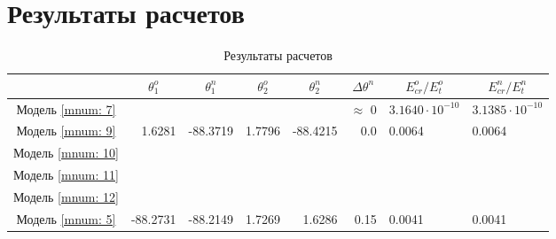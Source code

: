 \section{Результаты расчетов}

\begin{table}
\footnotesize
\centering
\caption{Результаты расчетов}
\renewcommand{\arraystretch}{1.5}
\begin{tabularx}{\textwidth}{C|rr|rr|r|ll}
				& &  &  &  & &  &  \\ \hline
\hline Модель \ref{mnum: 7} &  &  &  &  & $\approx$ 0   & $3.1640 \cdot 10^{-10}$ & $3.1385 \cdot 10^{-10}$ \\ 
 	   Модель \ref{mnum: 9} & 1.6281 & -88.3719 & 1.7796  & -88.4215  & 0.0  & 0.0064 & 0.0064 \\
 	   Модель \ref{mnum: 10} &  &  &   &   &   &  &  \\
 	   Модель \ref{mnum: 11} &  &  &   &   &   &  &  \\
 	   Модель \ref{mnum: 12} &  &  &   &   &   &  &  \\
	   Модель \ref{mnum: 5} & -88.2731 & -88.2149 & 1.7269  & 1.6286  & 0.15 & 0.0041 & 0.0041 \\ 	   
 	   \hline
\end{tabularx} 
\renewcommand{\arraystretch}{1.0}
\end{table}

